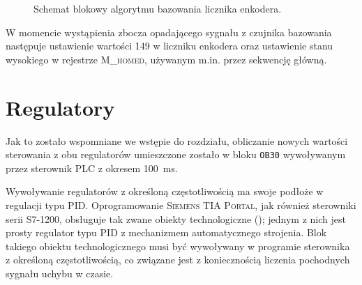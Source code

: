\begin{figure}[ht]
    \centering
    
    
    \caption{Schemat blokowy algorytmu bazowania licznika enkodera.}
    \label{fig:schemat_bazowania}
\end{figure}

W momencie wystąpienia zbocza opadającego sygnału z czujnika bazowania następuje ustawienie wartości \num{149} w liczniku enkodera oraz ustawienie stanu wysokiego w rejestrze \textsc{M\_homed}, używanym m.in. przez sekwencję główną.

\section{Regulatory}
\label{sec:ch7_regulatory}

Jak to zostało wspomniane we wstępie do rozdziału, obliczanie nowych wartości sterowania z obu regulatorów umieszczone zostało w bloku \texttt{OB30} wywoływanym przez sterownik PLC z okresem \SI{100}{\milli\second}.

Wywoływanie regulatorów z określoną częstotliwością ma swoje podłoże w regulacji typu PID. Oprogramowanie \textsc{Siemens TIA Portal}, jak również sterowniki serii S7-1200, obsługuje tak zwane obiekty technologiczne (\cite{S7MANUAL}\cite{SCL_S71200_S71500}); jednym z nich jest prosty regulator typu PID z mechanizmem automatycznego strojenia. Blok takiego obiektu technologicznego musi być wywoływany w programie sterownika z określoną częstotliwością, co związane jest z koniecznością liczenia pochodnych sygnału uchybu w czasie.

